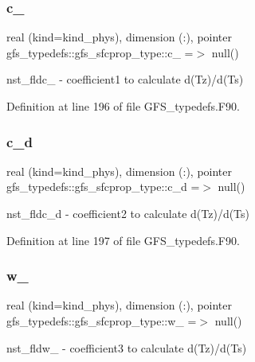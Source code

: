 \subsubsection{c\+\_}
{\footnotesize\ttfamily real (kind=kind\+\_\+phys), dimension    (\+:), pointer gfs\+\_\+typedefs\+::gfs\+\_\+sfcprop\+\_\+type\+::c\+\_ =$>$ null()}



nst\+\_\+fldc\+\_ -\/ coefficient1 to calculate d(\+Tz)/d(Ts) 



Definition at line 196 of file G\+F\+S\+\_\+typedefs.\+F90.

\mbox{\label{structgfs__typedefs_1_1gfs__sfcprop__type_acde96ba1bc74bc166e6ccb273a7ce114}} 
\subsubsection{c\+\_\+d}
{\footnotesize\ttfamily real (kind=kind\+\_\+phys), dimension    (\+:), pointer gfs\+\_\+typedefs\+::gfs\+\_\+sfcprop\+\_\+type\+::c\+\_\+d =$>$ null()}



nst\+\_\+fldc\+\_\+d -\/ coefficient2 to calculate d(\+Tz)/d(Ts) 



Definition at line 197 of file G\+F\+S\+\_\+typedefs.\+F90.

\mbox{\label{structgfs__typedefs_1_1gfs__sfcprop__type_a388ed9254586c5f0eb4ae90c0d026184}} 
\subsubsection{w\+\_}
{\footnotesize\ttfamily real (kind=kind\+\_\+phys), dimension    (\+:), pointer gfs\+\_\+typedefs\+::gfs\+\_\+sfcprop\+\_\+type\+::w\+\_ =$>$ null()}



nst\+\_\+fldw\+\_ -\/ coefficient3 to calculate d(\+Tz)/d(Ts) 




